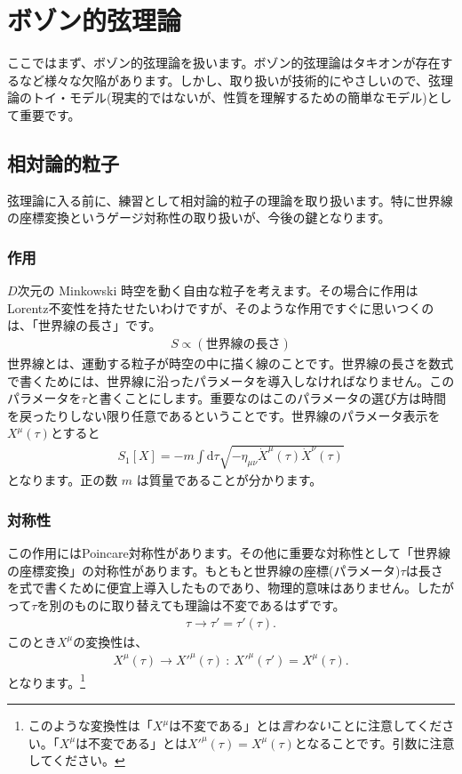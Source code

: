 \documentclass[report,paper=a4, fontsize=12pt, line_length=16cm, number_of_lines=33,dvipdfmx]{jlreq}
\numberwithin{equation}{chapter}
\numberwithin{equation}{section}
\newcommand{\di}{\mathrm{d}}
\begin{document}
\chapter{ボゾン的弦理論}

ここではまず、ボゾン的弦理論を扱います。ボゾン的弦理論はタキオンが存在するなど様々な欠陥があります。しかし、取り扱いが技術的にやさしいので、弦理論のトイ・モデル(現実的ではないが、性質を理解するための簡単なモデル)として重要です。

\section{相対論的粒子}
弦理論に入る前に、練習として相対論的粒子の理論を取り扱います。特に世界線の座標変換というゲージ対称性の取り扱いが、今後の鍵となります。
\subsection{作用}
$D$次元の Minkowski 時空を動く自由な粒子を考えます。その場合に作用はLorentz不変性を持たせたいわけですが、そのような作用ですぐに思いつくのは、「世界線の長さ」です。
\begin{align}
 S \propto (\text{世界線の長さ})
\end{align}
世界線とは、運動する粒子が時空の中に描く線のことです。世界線の長さを数式で書くためには、世界線に沿ったパラメータを導入しなければなりません。このパラメータを$\tau$と書くことにします。重要なのはこのパラメータの選び方は時間を戻ったりしない限り任意であるということです。世界線のパラメータ表示を$X^{\mu}(\tau)$とすると
\begin{align}
 S_{1}[X]=-m\int \di \tau \sqrt{-\eta_{\mu\nu}\dot{X}^{\mu}(\tau) \dot{X}^{\nu}(\tau)}
\label{particle-action1}
\end{align}
となります。正の数 $m$ は質量であることが分かります。
\subsection{対称性}
この作用にはPoincare対称性があります。その他に重要な対称性として「世界線の座標変換」の対称性があります。もともと世界線の座標(パラメータ)$\tau$は長さを式で書くために便宜上導入したものであり、物理的意味はありません。したがって$\tau$を別のものに取り替えても理論は不変であるはずです。
\begin{align}
 \tau\to \tau'=\tau'(\tau).
\end{align}
このとき$X^{\mu}$の変換性は、
\begin{align}
 X^{\mu}(\tau)\to X'^{\mu}(\tau)\ :\ X'^{\mu}(\tau')=X^{\mu}(\tau).
\label{particle-reparam1}
\end{align}
となります。\footnote{このような変換性は「$X^{\mu}$は不変である」とは{\em 言わない}ことに注意してください。「$X^{\mu}$は不変である」とは$X'^{\mu}(\tau)=X^{\mu}(\tau)$となることです。引数に注意してください。}
\end{document}
